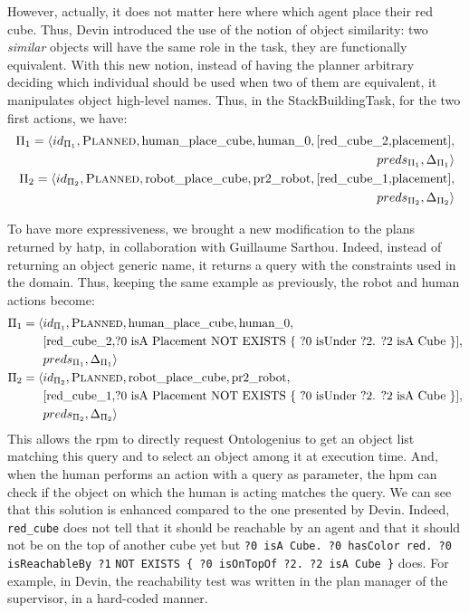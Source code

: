 \documentclass[a4paper,11pt,twoside]{StyleThese}
\begin{document}
However, actually, it does not matter here where which agent place their red cube. Thus, Devin introduced the use of the notion of object similarity: two \emph{similar} objects will have the same role in the task, they are functionally equivalent. With this new notion, instead of having the planner arbitrary deciding which individual should be used when two of them are equivalent, it manipulates object high-level names. Thus, in the StackBuildingTask, for the two first actions, we have:
\begin{align*}
\Pi_1=\langle id_{\Pi_1},\textsc{Planned},\text{human\_place\_cube},\text{human\_0}, [\text{red\_cube\_2,placement}],&\\ preds_{\Pi_1},\Delta_{\Pi_1}\rangle&\\
\Pi_2=\langle id_{\Pi_2},\textsc{Planned},\text{robot\_place\_cube},\text{pr2\_robot}, [\text{red\_cube\_1,placement}],&\\ preds_{\Pi_2},\Delta_{\Pi_2}\rangle&
\end{align*}

To have more expressiveness, we brought a new modification to the plans returned by \acrshort{hatp}, in collaboration with Guillaume Sarthou. Indeed, instead of returning an object generic name, it returns a \sparql{} query with the constraints used in the domain. Thus, keeping the same example as previously, the robot and human actions become:
\begin{align*}
\Pi_1=\langle & id_{\Pi_1},\textsc{Planned},\text{human\_place\_cube},\text{human\_0}, \\
&{}[\text{red\_cube\_2,?0 isA Placement NOT EXISTS \{ ?0 isUnder ?2. ?2 isA Cube \}}],\\ &preds_{\Pi_1},\Delta_{\Pi_1}\rangle\\
\Pi_2=\langle & id_{\Pi_2},\textsc{Planned},\text{robot\_place\_cube},\text{pr2\_robot}, \\
&{}[\text{red\_cube\_1,?0 isA Placement NOT EXISTS \{ ?0 isUnder ?2. ?2 isA Cube \}}],\\  &preds_{\Pi_2},\Delta_{\Pi_2}\rangle
\end{align*}
\thispagestyle{example}
This allows the \acrshort{rpm} to directly request Ontologenius to get an object list matching this query and to select an object among it at execution time. And, when the human performs an action with a \sparql{} query as parameter, the \acrshort{hpm} can check if the object on which the human is acting matches the query. We can see that this solution is enhanced compared to the one presented by Devin. Indeed, \verb'red_cube' does not tell that it should be reachable by an agent and that it should not be on the top of another cube yet but \verb'?0 isA Cube. ?0 hasColor red. ?0 isReachableBy ?1' \verb'NOT EXISTS { ?0 isOnTopOf ?2. ?2 isA Cube }' does. For example, in Devin, the reachability test was written in the plan manager of the supervisor, in a hard-coded manner. 
\end{document}
